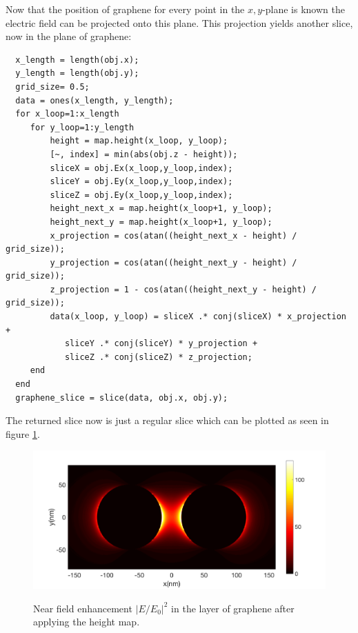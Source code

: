 Now that the position of graphene for every point in the $x,y$-plane is known the electric field can be projected onto this plane. This projection yields another slice, now in the plane of graphene:

\begin{verbatim}
  x_length = length(obj.x);
  y_length = length(obj.y);
  grid_size= 0.5;
  data = ones(x_length, y_length);
  for x_loop=1:x_length
     for y_loop=1:y_length
         height = map.height(x_loop, y_loop);
         [~, index] = min(abs(obj.z - height));
         sliceX = obj.Ex(x_loop,y_loop,index);
         sliceY = obj.Ey(x_loop,y_loop,index);
         sliceZ = obj.Ey(x_loop,y_loop,index);
         height_next_x = map.height(x_loop+1, y_loop);
         height_next_y = map.height(x_loop+1, y_loop);
         x_projection = cos(atan((height_next_x - height) / grid_size));
         y_projection = cos(atan((height_next_y - height) / grid_size));
         z_projection = 1 - cos(atan((height_next_y - height) / grid_size));
         data(x_loop, y_loop) = sliceX .* conj(sliceX) * x_projection +
            sliceY .* conj(sliceY) * y_projection +
            sliceZ .* conj(sliceZ) * z_projection;
     end
  end
  graphene_slice = slice(data, obj.x, obj.y);
\end{verbatim}

The returned slice now is just a regular slice which can be plotted as seen in figure \ref{fig:projected}.

\begin{figure}[!h]
  \centering
  \includegraphics[width=\textwidth]{./images/graphene-layer.png}
  \label{fig:projected}
  \caption{Near field enhancement $|E/E_0|^2$ in the layer of graphene after applying the height map.}
\end{figure}
